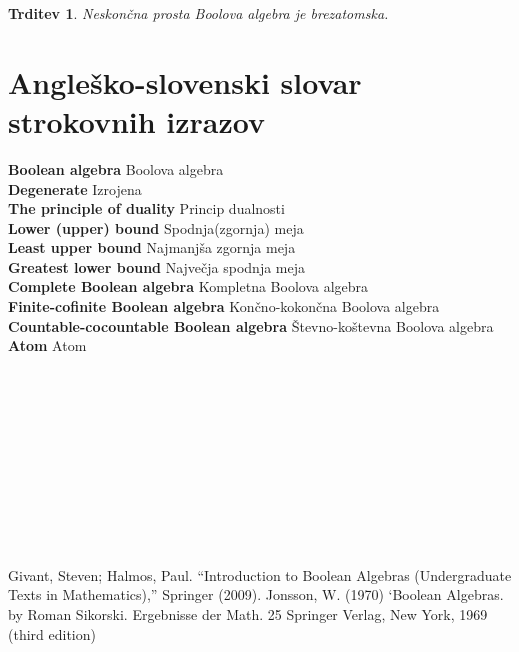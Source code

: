 \documentclass{amsart}
\newcommand{\geslo}[2]{\noindent\textbf{#1} \quad \hangindent=1cm #2\\[-1pc]}
\newtheorem{trditev}[izrek]{Trditev}
\begin{document}
\begin{trditev}
    Neskončna prosta Boolova algebra je brezatomska.
\end{trditev}

































\newpage
\section*{Angleško-slovenski slovar strokovnih izrazov}


\geslo{Boolean algebra}{Boolova algebra}

\geslo{Degenerate}{Izrojena}

\geslo{The principle of duality}{Princip dualnosti}

\geslo{Lower (upper) bound}{Spodnja(zgornja) meja}

\geslo{Least upper bound}{Najmanjša zgornja meja}

\geslo{Greatest lower bound}{Največja spodnja meja}

\geslo{Complete Boolean algebra}{Kompletna Boolova algebra}

\geslo{Finite-cofinite Boolean algebra}{Končno-kokončna Boolova algebra}

\geslo{Countable-cocountable Boolean algebra}{Števno-koštevna Boolova algebra}

\geslo{Atom}{Atom}

\geslo{}{}

\geslo{}{}

\geslo{}{}

\geslo{}{}

\geslo{}{}

\geslo{}{}

\geslo{}{}

\geslo{}{}

\geslo{}{}


\geslo{}{}






\begin{thebibliography}{1}
Givant, Steven; Halmos, Paul. ``Introduction to Boolean Algebras (Undergraduate Texts in Mathematics),'' Springer (2009).
Jonsson, W. (1970) ‘Boolean Algebras. by Roman Sikorski. Ergebnisse der Math. 25 Springer Verlag, New York, 1969 (third edition)
\end{thebibliography}
\end{document}
